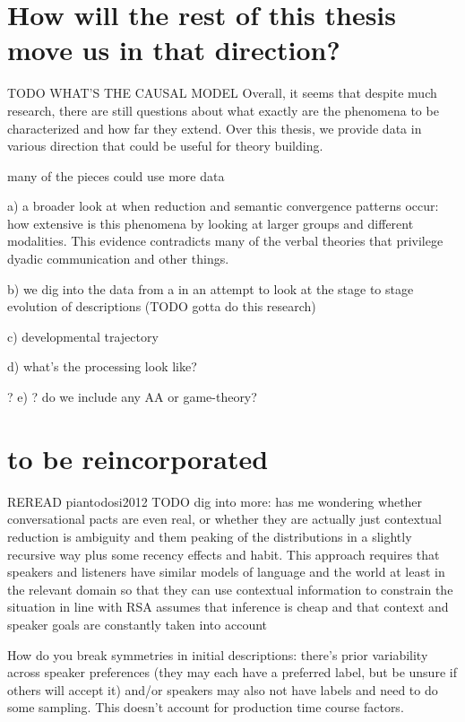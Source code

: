\documentclass[]{article}
\begin{document}
	
	\section{How will the rest of this thesis move us in that direction?}
	
	TODO WHAT'S THE CAUSAL MODEL
	Overall, it seems that despite much research, there are still questions about what exactly are the phenomena to be characterized and how far they extend. Over this thesis, we provide data in various direction that could be useful for theory building. 
	
	many of the pieces could use more data
	
	a) a broader look at when reduction and semantic convergence patterns occur: how extensive is this phenomena by looking at larger groups and different modalities. This evidence contradicts many of the verbal theories that privilege dyadic communication and other things. 
	
	b) we dig into the data from a in an attempt to look at the stage to stage evolution of descriptions (TODO gotta do this research)
	
	c) developmental trajectory
	
	d) what's the processing look like? 
	
	? e) ? do we include any AA or game-theory? 
	
	\section{to be reincorporated}
	REREAD piantodosi2012 
	TODO dig into more: \cite{piantadosi2012} has me wondering whether conversational pacts are even real, or whether they are actually just contextual reduction is ambiguity and them peaking of the distributions in a slightly recursive way plus some recency effects and habit. This approach requires that speakers and listeners have similar models of language and the world at least in the relevant domain so that they can use contextual information to constrain the situation 
	\cite{piantadosi2012} in line with RSA assumes that inference is cheap and that context and speaker goals are constantly taken into account 
	
	

	
	
	\cite{hawkins2020b} How do you break symmetries in initial descriptions: there's prior variability across speaker preferences (they may each have a preferred label, but be unsure if others will accept it) and/or speakers may also not have labels and need to do some sampling. This doesn't account for production time course factors. 
	
\end{document}
